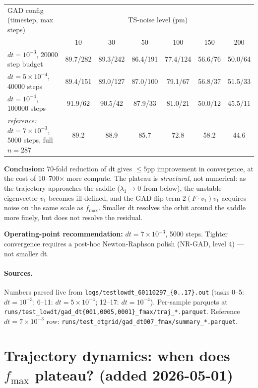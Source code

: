 \documentclass[11pt]{article}
\begin{document}
\begin{center}\small
\begin{tabular}{l|cccccc}
\toprule
GAD config (timestep, max steps) & \multicolumn{6}{c}{TS-noise level (pm)} \\
                                  & 10 & 30 & 50 & 100 & 150 & 200 \\
\midrule
$dt{=}10^{-3}$, 20000 step budget       & 89.7/282 & 89.3/242 & 86.4/191 & 77.4/124 & 56.6/76 & 50.0/64 \\
$dt{=}5\!\times\!10^{-4}$, 40000 steps  & 89.4/151 & 89.0/127 & 87.0/100 & 79.1/67  & 56.8/37 & 51.5/33 \\
$dt{=}10^{-4}$, 100000 steps            & 91.9/62  & 90.5/42  & 87.9/33  & 81.0/21  & 50.0/12 & 45.5/11 \\
\midrule
\textit{reference:} $dt{=}7\!\times\!10^{-3}$, 5000 steps, full $n{=}287$ & 89.2 & 88.9 & 85.7 & 72.8 & 58.2 & 44.6 \\
\bottomrule
\end{tabular}
\end{center}

\textbf{Conclusion:} 70-fold reduction of dt gives $\le 5$pp improvement in
convergence, at the cost of 10--700$\times$ more compute. The plateau is
\emph{structural}, not numerical: as the trajectory approaches the saddle
($\lambda_1 \to 0$ from below), the unstable eigenvector $v_1$ becomes
ill-defined, and the GAD flip term $2(F\!\cdot\!v_1)v_1$ acquires noise
on the same scale as $f_{\max}$. Smaller dt resolves the orbit around the
saddle more finely, but does not resolve the residual.

\textbf{Operating-point recommendation:} $dt=7\!\times\!10^{-3}$, 5000 steps.
Tighter convergence requires a post-hoc Newton-Raphson polish (NR-GAD,
level 4) — not smaller dt.

\paragraph{Sources.} Numbers parsed live from
\texttt{logs/testlowdt\_60110297\_\{0..17\}.out} (tasks 0--5: $dt{=}10^{-3}$;
6--11: $dt{=}5\!\times\!10^{-4}$; 12--17: $dt{=}10^{-4}$).
Per-sample parquets at \texttt{runs/test\_lowdt/gad\_dt\{001,0005,0001\}\_fmax/traj\_*.parquet}.
Reference $dt{=}7\!\times\!10^{-3}$ row: \texttt{runs/test\_dtgrid/gad\_dt007\_fmax/summary\_*.parquet}.

\section{Trajectory dynamics: when does $f_{\max}$ plateau? (added 2026-05-01)}
\end{document}
